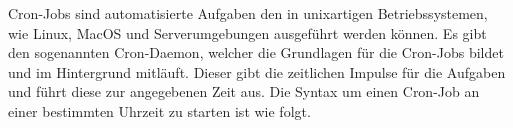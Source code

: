 Cron-Jobs sind automatisierte Aufgaben den in unixartigen Betriebssystemen, wie Linux, MacOS und Serverumgebungen ausgeführt werden können. Es gibt den sogenannten Cron-Daemon, welcher die Grundlagen für die Cron-Jobs bildet und im Hintergrund mitläuft. Dieser gibt die zeitlichen Impulse für die Aufgaben und führt diese zur angegebenen Zeit aus. Die Syntax um einen Cron-Job an einer bestimmten Uhrzeit zu starten ist wie folgt.